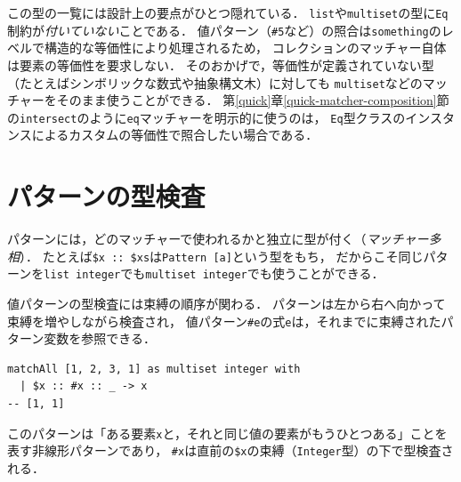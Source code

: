 この型の一覧には設計上の要点がひとつ隠れている．
\lstinline{list}や\lstinline{multiset}の型に\lstinline{Eq}制約が\emph{付いていない}ことである．
値パターン（\lstinline{#5}など）の照合は\lstinline{something}のレベルで構造的な等価性により処理されるため，
コレクションのマッチャー自体は要素の等価性を要求しない．
そのおかげで，等価性が定義されていない型（たとえばシンボリックな数式や抽象構文木）に対しても
\lstinline{multiset}などのマッチャーをそのまま使うことができる．
第\ref{quick}章\ref{quick-matcher-composition}節の\lstinline{intersect}のように\lstinline{eq}マッチャーを明示的に使うのは，
\lstinline{Eq}型クラスのインスタンスによるカスタムの等価性で照合したい場合である．

\section{パターンの型検査}\label{matcher-pattern-typing}

パターンには，どのマッチャーで使われるかと独立に型が付く（\emph{マッチャー多相}）．
たとえば\lstinline{$x :: $xs}は\lstinline{Pattern [a]}という型をもち，
だからこそ同じパターンを\lstinline{list integer}でも\lstinline{multiset integer}でも使うことができる．

値パターンの型検査には束縛の順序が関わる．
パターンは左から右へ向かって束縛を増やしながら検査され，
値パターン\lstinline{#e}の式\lstinline{e}は，それまでに束縛されたパターン変数を参照できる．
\begin{lstlisting}[language=egison,numbers=none]
matchAll [1, 2, 3, 1] as multiset integer with
  | $x :: #x :: _ -> x
-- [1, 1]
\end{lstlisting}
このパターンは「ある要素\lstinline{x}と，それと同じ値の要素がもうひとつある」ことを表す非線形パターンであり，
\lstinline{#x}は直前の\lstinline{$x}の束縛（\lstinline{Integer}型）の下で型検査される．

